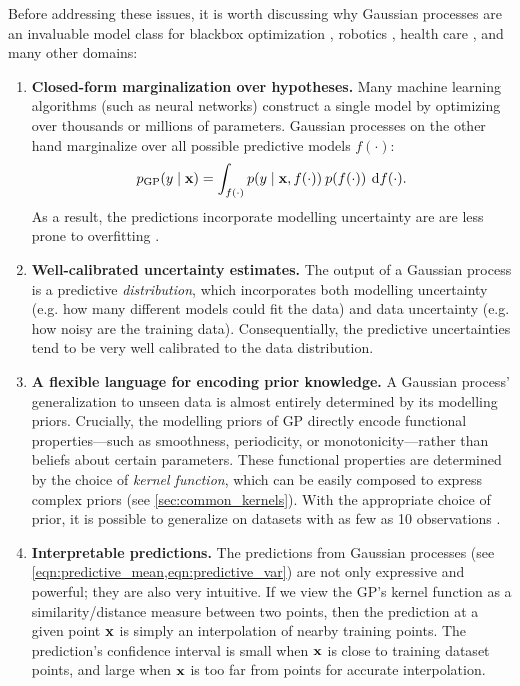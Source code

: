Before addressing these issues, it is worth discussing why Gaussian processes are an invaluable model class for blackbox optimization \citep[e.g.][]{snoek2012practical}, robotics \citep[e.g.][]{deisenroth2011pilco}, health care \citep[e.g.][]{schulam2015framework}, and many other domains:
\begin{enumerate}
  \item {\bf Closed-form marginalization over hypotheses.}
    Many machine learning algorithms (such as neural networks) construct a single model by optimizing over thousands or millions of parameters.
    Gaussian processes on the other hand marginalize over all possible predictive models $f(\cdot)$:
    \[
      p_\text{GP} ( y \mid \mathbf{x} ) = \int_{f(\cdot)} p( y \mid \mathbf{x}, f(\cdot)) \: p(f(\cdot)) \: \,\mathrm{d}{f}(\cdot).
    \]
    As a result, the predictions incorporate modelling uncertainty are are less prone to overfitting \cite{rasmussen2006gaussian}.

  \item {\bf Well-calibrated uncertainty estimates.}
    The output of a Gaussian process is a predictive \emph{distribution}, which incorporates both modelling uncertainty (e.g. how many different models could fit the data) and data uncertainty (e.g. how noisy are the training data).
    Consequentially, the predictive uncertainties tend to be very well calibrated to the data distribution.

  \item {\bf A flexible language for encoding prior knowledge.}
    A Gaussian process' generalization to unseen data is almost entirely determined by its modelling priors.
    Crucially, the modelling priors of GP directly encode functional properties---such as smoothness, periodicity, or monotonicity---rather than beliefs about certain parameters.
    These functional properties are determined by the choice of \emph{kernel function}, which can be easily composed to express complex priors (see \cref{sec:common_kernels}).
    With the appropriate choice of prior, it is possible to generalize on datasets with as few as 10 observations \citep[e.g.]{rasmussen2006gaussian,gardner2017discovering}.

  \item {\bf Interpretable predictions.}
    The predictions from Gaussian processes (see \cref{eqn:predictive_mean,eqn:predictive_var}) are not only expressive and powerful; they are also very intuitive.
    If we view the GP's kernel function as a similarity/distance measure between two points, then the prediction at a given point $\mathbf{x}$ is simply an interpolation of nearby training points.
    The prediction's confidence interval is small when $\mathbf{x}$ is close to training dataset points, and large when $\mathbf{x}$ is too far from points for accurate interpolation.
\end{enumerate}

